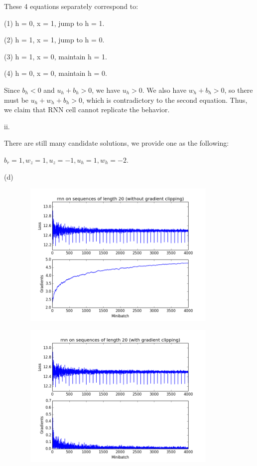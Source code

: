 \documentclass{article}
\theoremstyle{definition}
\theoremstyle{remark}
\numberwithin{equation}{section}
\begin{document}
These 4 equations separately correspond to:

(1) h = 0, x = 1, jump to h = 1. 

(2) h = 1, x = 1, jump to h = 0. 

(3) h = 1, x = 0, maintain h = 1. 
 
(4) h = 0, x = 0, maintain h = 0. 

Since $b_h < 0$ and $u_h  + b_h > 0$, we have $u_h > 0$. We also have $w_h + b_h > 0$, so there must be $u_h + w_h + b_h > 0$, which is contradictory to the second equation. Thus, we claim that RNN cell cannot replicate the behavior.

\vspace{10pt}

ii.

There are still many candidate solutions, we provide one as the following:

$b_r = 1, w_z = 1, u_z = -1, u_h = 1, w_h = -2$.

\newpage
(d)

 \begin{figure}[H] 
  \centering
 \includegraphics[width=100mm, height=70mm]{fig/q3-noclip-rnn.png}
   \caption{}
   \label{fig: noclip_rnn}
 \end{figure}
 
  \begin{figure}[H] 
  \centering
 \includegraphics[width=100mm, height=70mm]{fig/q3-clip-rnn.png}
   \caption{}
   \label{fig: clip_rnn}
 \end{figure}
 
\end{document}
